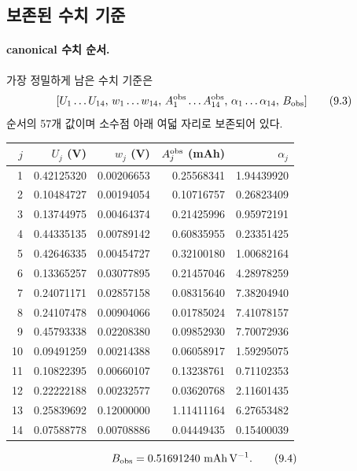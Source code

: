 \subsection{보존된 수치 기준}

\paragraph{ canonical 수치 순서.}
가장 정밀하게 남은 수치 기준은
\[
[U_1\ldots U_{14},\,w_1\ldots w_{14},\,
A_1^{\mathrm{obs}}\ldots A_{14}^{\mathrm{obs}},\,
\alpha_1\ldots\alpha_{14},\,B_{\mathrm{obs}}]
\tag{9.3}
\]
순서의 57개 값이며 소수점 아래 여덟 자리로 보존되어 있다.

\begin{longtable}{rrrrr}
\toprule
$j$ & {$U_j$ (V)} & {$w_j$ (V)} &
{$A_j^{\mathrm{obs}}$ (mAh)} & {$\alpha_j$}\\
\midrule\endhead
1  & 0.42125320 & 0.00206653 & 0.25568341 & 1.94439920\\
2  & 0.10484727 & 0.00194054 & 0.10716757 & 0.26823409\\
3  & 0.13744975 & 0.00464374 & 0.21425996 & 0.95972191\\
4  & 0.44335135 & 0.00789142 & 0.60835955 & 0.23351425\\
5  & 0.42646335 & 0.00454727 & 0.32100180 & 1.00682164\\
6  & 0.13365257 & 0.03077895 & 0.21457046 & 4.28978259\\
7  & 0.24071171 & 0.02857158 & 0.08315640 & 7.38204940\\
8  & 0.24107478 & 0.00904066 & 0.01785024 & 7.41078157\\
9  & 0.45793338 & 0.02208380 & 0.09852930 & 7.70072936\\
10 & 0.09491259 & 0.00214388 & 0.06058917 & 1.59295075\\
11 & 0.10822395 & 0.00660107 & 0.13238761 & 0.71102353\\
12 & 0.22222188 & 0.00232577 & 0.03620768 & 2.11601435\\
13 & 0.25839692 & 0.12000000 & 1.11411164 & 6.27653482\\
14 & 0.07588778 & 0.00708886 & 0.04449435 & 0.15400039\\
\bottomrule
\end{longtable}
\[
B_{\mathrm{obs}}=0.51691240\ {\rm mAh\,V^{-1}}.
\tag{9.4}
\]


